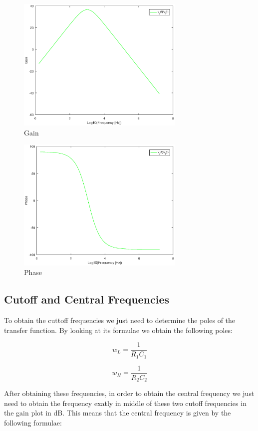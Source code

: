 \begin{figure}[H] 
\centering
\includegraphics[width = 8cm]{gain.eps} 
\caption{Gain}
\label{gain}
\end{figure}

\begin{figure}[H] 
\centering
\includegraphics[width = 8cm]{phase.eps} 
\caption{Phase}
\label{phase}
\end{figure}

\subsection{Cutoff and Central Frequencies}

To obtain the cuttoff frequencies we just need to determine the poles of the transfer function. By looking at its formulae we obtain the following poles:

\begin{equation}
w_L = \frac{1}{R_1C_1}
\end{equation} 

\begin{equation}
w_H = \frac{1}{R_2C_2}
\end{equation} 

After obtaining these frequencies, in order to obtain the central frequency we just need to  obtain the frequency exatly in middle of these two cutoff frequencies in the gain plot in dB. This means that the central frequency is given by the following formulae:

